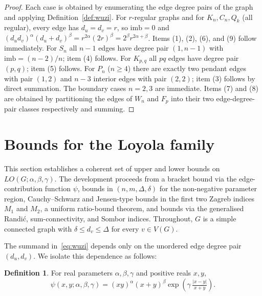 \documentclass[a5paper, 10pt]{article}
\theoremstyle{plain}
\theoremstyle{remark}
\theoremstyle{definition}
\newtheorem{definition}{Definition}
\newcommand{\Wuzi}{LO(G;\alpha,\beta,\gamma)}
\newcommand{\edgepsi}{\psi(x,y;\alpha,\beta,\gamma)}
\begin{document}
  \begin{proof}
  Each case is obtained by enumerating the edge degree pairs of the
  graph and applying Definition~\ref{def:wuzi}. For $r$-regular
  graphs and for $K_n, C_n, Q_k$ (all regular), every edge has
  $d_u = d_v = r$, so $\mathrm{imb} = 0$ and
  $(d_u d_v)^{\alpha}(d_u + d_v)^{\beta}
     = r^{2\alpha}(2r)^{\beta} = 2^{\beta} r^{2\alpha + \beta}$.
  Items (1), (2), (6), and (9) follow immediately. For $S_n$ all
  $n - 1$ edges have degree pair $(1, n - 1)$ with
  $\mathrm{imb} = (n - 2)/n$; item (4) follows. For $K_{p, q}$ all
  $pq$ edges have degree pair $(p, q)$; item (5) follows. For $P_n$
  ($n \ge 4$) there are exactly two pendant edges with pair $(1, 2)$
  and $n - 3$ interior edges with pair $(2, 2)$; item (3) follows by
  direct summation. The boundary cases $n = 2, 3$ are immediate.
  Items (7) and (8) are obtained by partitioning the edges of $W_n$
  and $F_p$ into their two edge-degree-pair classes respectively and
  summing.
  \end{proof}

  \section{Bounds for the Loyola family}\label{sec:bounds}

  This section establishes a coherent set of upper and lower bounds
  on $\Wuzi$. The development proceeds from a bracket bound via the
  edge-contribution function $\psi$,  bounds in $(n, m, \Delta, \delta)$
  for the non-negative
  parameter region, Cauchy--Schwarz and
  Jensen-type bounds in the first two Zagreb indices $M_1$ and
  $M_2$,
  a uniform ratio-bound theorem, and bounds via the generalised
  Randi\'c, sum-connectivity, and Sombor indices. Throughout, $G$
  is a simple connected graph with $\delta \le d_v \le \Delta$ for
  every $v \in V(G)$.

  The summand in~\eqref{eq:wuzi} depends only on the unordered
  edge degree pair $(d_u, d_v)$. We isolate this dependence as follows:

  \begin{definition}\label{def:psi}
  For real parameters $\alpha, \beta, \gamma$ and positive reals
  $x, y$,
  \begin{equation}\label{eq:psi}
  \edgepsi = (xy)^{\alpha}(x + y)^{\beta}
  \exp\!\left(\gamma\,\tfrac{|x - y|}{x + y}\right).
  \end{equation}
  \end{definition}
\end{document}
